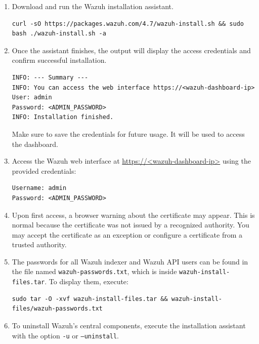 \begin{enumerate}
  \item Download and run the Wazuh installation assistant.

  \begin{verbatim}
curl -sO https://packages.wazuh.com/4.7/wazuh-install.sh && sudo bash ./wazuh-install.sh -a
  \end{verbatim}

  \item Once the assistant finishes, the output will display the access credentials and confirm successful installation.

  \begin{verbatim}
INFO: --- Summary ---
INFO: You can access the web interface https://<wazuh-dashboard-ip>
User: admin
Password: <ADMIN_PASSWORD>
INFO: Installation finished.
  \end{verbatim}

  Make sure to save the credentials for future usage. It will be used to access the dashboard.

  \item Access the Wazuh web interface at \url{https://<wazuh-dashboard-ip>} using the provided credentials:

    \begin{verbatim}
Username: admin
Password: <ADMIN_PASSWORD>
    \end{verbatim}

  \item Upon first access, a browser warning about the certificate may appear. This is normal because the certificate was not issued by a recognized authority. You may accept the certificate as an exception or configure a certificate from a trusted authority.

  \item The passwords for all Wazuh indexer and Wazuh API users can be found in the file named \texttt{wazuh-passwords.txt}, which is inside \texttt{wazuh-install-files.tar}. To display them, execute:
  \begin{verbatim}
sudo tar -O -xvf wazuh-install-files.tar && wazuh-install-files/wazuh-passwords.txt
  \end{verbatim}

  \item To uninstall Wazuh's central components, execute the installation assistant with the option \texttt{-u} or \texttt{--uninstall}.
\end{enumerate}

